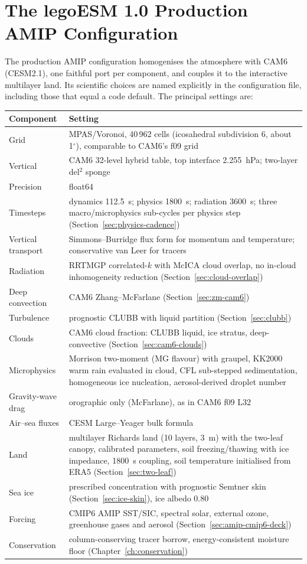 \documentclass[11pt,twoside]{report}
\begin{document}
\section{The legoESM 1.0 Production AMIP Configuration}
\label{sec:production-amip}

The production AMIP configuration homogenises the atmosphere with CAM6
(CESM2.1), one faithful port per component, and couples it to the interactive
multilayer land.  Its scientific choices are named explicitly in the
configuration file, including those that equal a code default.  The principal
settings are:
\begin{center}
\begin{tabularx}{\textwidth}{lX}
\toprule
Component & Setting \\
\midrule
Grid & MPAS/Voronoi, 40\,962 cells (icosahedral subdivision 6, about
  1$^\circ$), comparable to CAM6's f09 grid \\
Vertical & CAM6 32-level hybrid table, top interface 2.255~hPa; two-layer
  del$^2$ sponge \\
Precision & float64 \\
Timesteps & dynamics 112.5~s; physics 1800~s; radiation 3600~s;
  three macro/microphysics sub-cycles per physics step
  (Section~\ref{sec:physics-cadence}) \\
Vertical transport & Simmons--Burridge flux form for momentum and
  temperature; conservative van Leer for tracers \\
Radiation & RRTMGP correlated-$k$ with McICA cloud overlap, no in-cloud
  inhomogeneity reduction (Section~\ref{sec:cloud-overlap}) \\
Deep convection & CAM6 Zhang--McFarlane (Section~\ref{sec:zm-cam6}) \\
Turbulence & prognostic CLUBB with liquid partition
  (Section~\ref{sec:clubb}) \\
Clouds & CAM6 cloud fraction: CLUBB liquid, ice stratus, deep-convective
  (Section~\ref{sec:cam6-clouds}) \\
Microphysics & Morrison two-moment (MG flavour) with graupel, KK2000 warm
  rain evaluated in cloud, CFL sub-stepped sedimentation, homogeneous ice
  nucleation, aerosol-derived droplet number \\
Gravity-wave drag & orographic only (McFarlane), as in CAM6 f09 L32 \\
Air--sea fluxes & CESM Large--Yeager bulk formula \\
Land & multilayer Richards land (10 layers, 3~m) with the two-leaf canopy,
  calibrated parameters, soil freezing/thawing with ice impedance, 1800~s
  coupling, soil temperature initialised from ERA5 (Section~\ref{sec:two-leaf}) \\
Sea ice & prescribed concentration with prognostic Semtner skin
  (Section~\ref{sec:ice-skin}), ice albedo 0.80 \\
Forcing & CMIP6 AMIP SST/SIC, spectral solar, external ozone, greenhouse
  gases and aerosol (Section~\ref{sec:amip-cmip6-deck}) \\
Conservation & column-conserving tracer borrow, energy-consistent moisture
  floor (Chapter~\ref{ch:conservation}) \\
\bottomrule
\end{tabularx}
\end{center}
\end{document}
